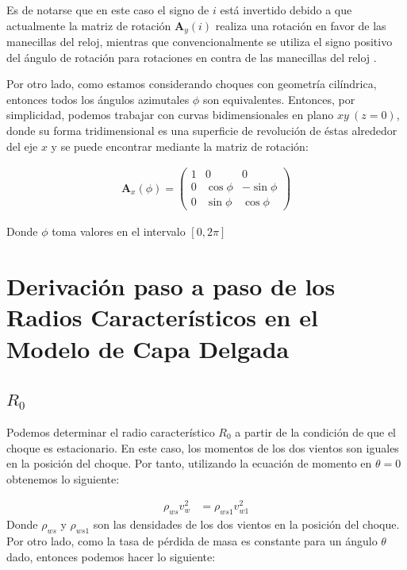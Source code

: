 Es de notarse que en este caso el signo de $i$ está invertido debido a que actualmente la matriz de rotación $\mathbf{A}_y(i)$ realiza una rotación en favor de las manecillas del reloj, mientras que convencionalmente se utiliza el signo positivo del ángulo de rotación para rotaciones en contra de las manecillas del reloj \citep{Bronson}.

Por otro lado, como estamos considerando choques con geometría cilíndrica, entonces todos los ángulos azimutales $\phi$ son equivalentes. Entonces, por simplicidad, podemos trabajar con curvas bidimensionales en plano $xy~(z=0)$, donde su forma tridimensional es una superficie de revolución de éstas alrededor del eje $x$ y se puede encontrar mediante la matriz de rotación:

\begin{align}
  \mathbf{A}_x(\phi) = \left(
  \begin{array}{ccc}
    1 & 0        & 0         \\
    0 & \cos\phi & -\sin\phi \\
    0 & \sin\phi & \cos\phi
  \end{array}
  \right) \label{eq:x-matrix}
\end{align}

Donde $\phi$ toma valores en el intervalo $[0, 2\pi]$

\chapter[Derivación de Radios Característicos]{Derivación paso a paso de los Radios Característicos en el Modelo de Capa Delgada}
\label{app:derivation-radii}
\thispagestyle{empty}
\section{$R_0$}
Podemos determinar el radio característico $R_0$ a partir de la condición de que el choque es estacionario. En este caso,
los momentos de los dos vientos son iguales en la posición del choque. Por tanto, utilizando la ecuación de momento en $\theta=0$
obtenemos lo siguiente:

\begin{align}
  \rho_{ws} v^2_w &= \rho_{ws1} v^2_{w1}
\end{align}
Donde $\rho_{ws}$ y $\rho_{ws1}$ son las densidades de los dos vientos en la posición del choque. Por otro lado, como la tasa de pérdida
de masa es constante para un ángulo $\theta$ dado, entonces podemos hacer lo siguiente:

